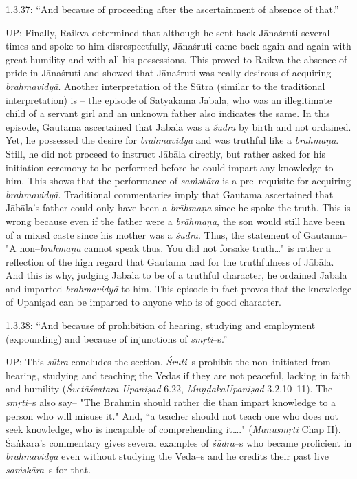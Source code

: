 1.3.37: “And because of proceeding after the ascertainment of absence of that.”

UP: Finally, Raikva determined that although he sent back Jānaśruti several times and spoke to him disrespectfully, Jānaśruti came back again and again with great humility and with all his possessions. This proved to Raikva the absence of pride in Jānaśruti and showed that Jānaśruti was really desirous of acquiring \textit{brahmavidyā}. Another interpretation of the Sūtra (similar to the traditional interpretation) is – the episode of Satyakāma Jābāla, who was an illegitimate child of a servant girl and an unknown father also indicates the same. In this episode, Gautama ascertained that Jābāla was a \textit{śūdra} by birth and not ordained. Yet, he possessed the desire for \textit{brahmavidyā} and was truthful like a \textit{brāhmaṇa}. Still, he did not proceed to instruct Jābāla directly, but rather asked for his initiation ceremony to be performed before he could impart any knowledge to him. This shows that the performance of \textit{saṁskāra} is a pre–requisite for acquiring \textit{brahmavidyā}. Traditional commentaries imply that Gautama ascertained that Jābāla's father could only have been a \textit{brāhmaṇa} since he spoke the truth. This is wrong because even if the father were a \textit{brāhmaṇa}, the son would still have been of a mixed caste since his mother was a \textit{śūdra}. Thus, the statement of Gautama– "A non–\textit{brāhmaṇa} cannot speak thus. You did not forsake truth…" is rather a reflection of the high regard that Gautama had for the truthfulness of Jābāla. And this is why, judging Jābāla to be of a truthful character, he ordained Jābāla and imparted \textit{brahmavidyā} to him. This episode in fact proves that the knowledge of Upaniṣad can be imparted to anyone who is of good character.

1.3.38: “And because of prohibition of hearing, studying and employment (expounding) and because of injunctions of \textit{smṛti}–s.”

UP: This \textit{sūtra} concludes the section. \textit{Śruti}–s prohibit the non–initiated from hearing, studying and teaching the Vedas if they are not peaceful, lacking in faith and humility (\textit{Śvetāśvatara Upaniṣad } 6.22, \textit{MuṇḍakaUpaniṣad }3.2.10–11). The \textit{smṛti}–s also say– "The Brahmin should rather die than impart knowledge to a person who will misuse it." And, “a teacher should not teach one who does not seek knowledge, who is incapable of comprehending it…." (\textit{Manusmṛti} Chap II). Śaṅkara’s commentary gives several examples of \textit{śūdra}–s who became proficient in \textit{brahmavidyā} even without studying the Veda–s and he credits their past live \textit{saṁskāra}–s for that.


